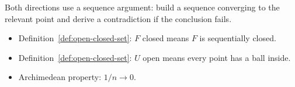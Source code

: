 \begin{remark*}
Both directions use a sequence argument: build a sequence converging
to the relevant point and derive a contradiction if the conclusion fails.
\end{remark*}

\begin{remark*}[Dependencies]
\begin{itemize}
  \item Definition~\ref{def:open-closed-set}: $F$ closed means $F$ is sequentially closed.
  \item Definition~\ref{def:open-closed-set}: $U$ open means every point has a ball inside.
  \item Archimedean property: $1/n \to 0$.
\end{itemize}
\end{remark*}

